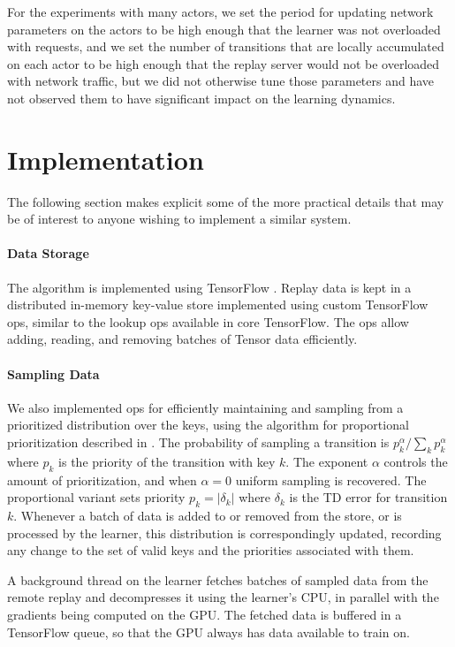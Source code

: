 \documentclass{article} %
\begin{document}
For the experiments with many actors, we set the period for updating network parameters on the actors to be high enough that the learner was not overloaded with requests, and we set the number of transitions that are locally accumulated on each actor to be high enough that the replay server would not be overloaded with network traffic, but we did not otherwise tune those parameters and have not observed them to have significant impact on the learning dynamics.

\section{Implementation}
\label{sec:app_implementation}

The following section makes explicit some of the more practical details that may be of interest to anyone wishing to implement a similar system.

\paragraph{Data Storage}

The algorithm is implemented using TensorFlow \citep{tensorflow}.  Replay data is kept in a distributed in-memory key-value store implemented using custom TensorFlow ops, similar to the lookup ops available in core TensorFlow. The ops allow adding, reading, and removing batches of Tensor data efficiently.

\paragraph{Sampling Data}

We also implemented ops for efficiently maintaining and sampling from a prioritized distribution over the keys, using the algorithm for proportional prioritization described in \cite{prioritized-replay}. The probability of sampling a transition is $p_k^{\alpha}/\sum_k p_k^{\alpha}$ where $p_k$ is the priority of the transition with key $k$. The exponent $\alpha$ controls the amount of prioritization, and when $\alpha = 0$ uniform sampling is recovered. The proportional variant sets priority $p_k = |\delta_k|$ where $\delta_k$ is the TD error for transition $k$. Whenever a batch of data is added to or removed from the store, or is processed by the learner, this distribution is correspondingly updated, recording any change to the set of valid keys and the priorities associated with them. 

A background thread on the learner fetches batches of sampled data from the remote replay and decompresses it using the learner's CPU, in parallel with the gradients being computed on the GPU. The fetched data is buffered in a TensorFlow queue, so that the GPU always has data available to train on.
\end{document}
